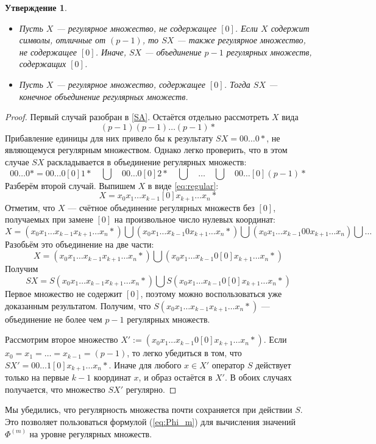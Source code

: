 \documentclass[14pt, a4paper, russian]{report}
\newtheorem{proposition}{\indent Утверждение}
\begin{document}
\begin{proposition}\label{s_regular}\nobreakspace
\begin{itemize}
\item Пусть $X$ --- регулярное множество, не содержащее $[0]$. Если $X$ содержит символы, отличные от $(p-1)$, то $SX$ --- также регулярное множество, не содержащее $[0]$. Иначе, $SX$ --- объединение $p-1$ регулярных множеств, содержащих $[0]$.
\item Пусть $X$ --- регулярное множество, содержащее $[0]$. Тогда $SX$ --- конечное объединение регулярных множеств.
\end{itemize}
\end{proposition}
\begin{proof}
Первый случай разобран в \cref{SA}. Остаётся отдельно рассмотреть $X$ вида $$(p-1)(p-1)\ldots(p-1)*$$ Прибавление единицы для них привело бы к результату $SX=00\ldots0*$, не являющемуся регулярным множеством. Однако легко проверить, что в этом случае $SX$ раскладывается в объединение регулярных множеств:
$$ 00\ldots0* = 00\ldots0[0]1* \quad \bigcup \quad 00\ldots0[0]2* \quad \bigcup \quad \ldots \quad \bigcup \quad 00\ldots[0](p-1)*$$
Разберём второй случай.
Выпишем $X$ в виде \ref{eq:regular}:
$$ X = x_0 x_1 \ldots x_{k-1} [0] x_{k+1} \ldots x_n *$$
Отметим, что $X$ --- счётное объединение регулярных множеств без $[0]$, получаемых при замене $[0]$ на произвольное число нулевых координат:
$$ X = (x_0 x_1 \ldots x_{k-1} x_{k+1} \ldots x_n*) \bigcup (x_0 x_1 \ldots x_{k-1} 0 x_{k+1} \ldots x_n*) \bigcup (x_0 x_1 \ldots x_{k-1} 0 0 x_{k+1} \ldots x_n) \bigcup \ldots$$
Разобьём это объединение на две части:
$$ X = (x_0 x_1 \ldots x_{k-1} x_{k+1} \ldots x_n*) \bigcup (x_0 x_1 \ldots x_{k-1}  0 [0] x_{k+1} \ldots x_n*)$$
Получим $$SX = S(x_0 x_1 \ldots x_{k-1} x_{k+1} \ldots x_n*) \bigcup S(x_0 x_1 \ldots x_{k-1}  0 [0] x_{k+1} \ldots x_n*)$$
Первое множество не содержит $[0]$, поэтому можно воспользоваться уже доказанным результатом. Получим, что $S(x_0 x_1 \ldots x_{k-1} x_{k+1} \ldots x_n*)$ --- объединение не более чем $p-1$ регулярных множеств.

Рассмотрим второе множество $X' := (x_0 x_1 \ldots x_{k-1}  0 [0] x_{k+1} \ldots x_n*)$. Если $x_0 = x_1 = \ldots = x_{k-1} = (p-1)$, то легко убедиться в том, что $SX' = 0 0 \ldots 1 [0] x_{k+1} \ldots x_n *$. Иначе для любого $x \in X'$ оператор $S$ действует только на первые $k-1$ координат $x$, и образ остаётся в $X'$. В обоих случаях получается, что множество $S X'$ регулярно.
\end{proof}
Мы убедились, что регулярность множества почти сохраняется при действии $S$. Это позволяет пользоваться формулой (\ref{eq:Phi_m}) для вычисления значений $\Phi^{(m)}$ на уровне регулярных множеств.
\end{document}
